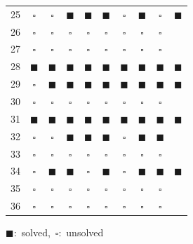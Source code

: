\begin{table}
\begin{minipage}[t]{0.49\linewidth}
\begin{tabular}[t]{c | c | c | c | c | c | c | c | c | c}
			25 & $\square$ & $\square$ & $\blacksquare$ & $\blacksquare$ & $\blacksquare$ & $\square$ & $\blacksquare$ & $\square$ & $\blacksquare$ \\
			26 & $\square$ & $\square$ & $\square$ & $\square$ & $\square$ & $\square$ & $\square$ & $\square$ & \\
			27 & $\square$ & $\square$ & $\square$ & $\square$ & $\square$ & $\square$ & $\square$ & $\square$ & \\
			28 & $\blacksquare$ & $\blacksquare$ & $\blacksquare$ & $\blacksquare$ & $\blacksquare$ & $\blacksquare$ & $\blacksquare$ & $\blacksquare$ & $\blacksquare$ \\
			29 & $\square$ & $\blacksquare$ & $\blacksquare$ & $\blacksquare$ & $\blacksquare$ & $\blacksquare$ & $\blacksquare$ & $\blacksquare$ & $\blacksquare$ \\
			30 & $\square$ & $\square$ & $\square$ & $\square$ & $\square$ & $\square$ & $\square$ & $\square$ & \\
			31 & $\blacksquare$ & $\blacksquare$ & $\blacksquare$ & $\blacksquare$ & $\blacksquare$ & $\blacksquare$ & $\blacksquare$ & $\blacksquare$ & $\blacksquare$ \\
			32 & $\square$ & $\square$ & $\blacksquare$ & $\blacksquare$ & $\blacksquare$ & $\square$ & $\blacksquare$ & $\blacksquare$ &  \\ 
			33 & $\square$ & $\square$ & $\square$ & $\square$ & $\square$ & $\square$ & $\square$ & $\square$ & \\
			34 & $\square$ & $\blacksquare$ & $\blacksquare$ & $\square$ & $\blacksquare$ & $\square$ & $\blacksquare$ & $\blacksquare$ & $\blacksquare$ \\
			35 & $\square$ & $\square$ & $\square$ & $\square$ & $\square$ & $\square$ & $\square$ & $\square$ & \\
			36 & $\square$ & $\square$ & $\square$ & $\square$ & $\square$ & $\square$ & $\square$ & $\square$ & \\
			\hline
		\end{tabular} %
	\end{minipage}
	\mbox{$\blacksquare$: solved, $\square$: unsolved}
\end{table}

